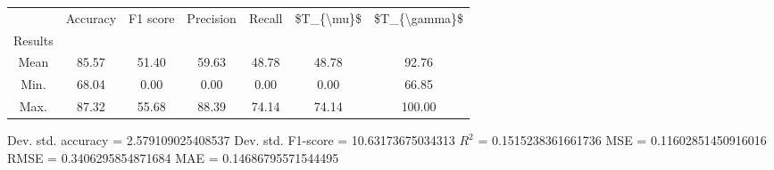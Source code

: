 \begin{tabular}{|c|c|c|c|c|c|c|}
\toprule
{} &  Accuracy &  F1 score &  Precision &  Recall &  \$T\_\{\textbackslash mu\}\$ &  \$T\_\{\textbackslash gamma\}\$ \\
Results &           &           &            &         &            &               \\
\hline
Mean    &     85.57 &     51.40 &      59.63 &   48.78 &      48.78 &         92.76 \\
Min.    &     68.04 &      0.00 &       0.00 &    0.00 &       0.00 &         66.85 \\
Max.    &     87.32 &     55.68 &      88.39 &   74.14 &      74.14 &        100.00 \\
\bottomrule
\end{tabular}

 Dev. std. accuracy = 2.579109025408537
 Dev. std. F1-score = 10.63173675034313
 $R^2$ = 0.1515238361661736
 MSE = 0.11602851450916016
 RMSE = 0.3406295854871684
 MAE = 0.14686795571544495